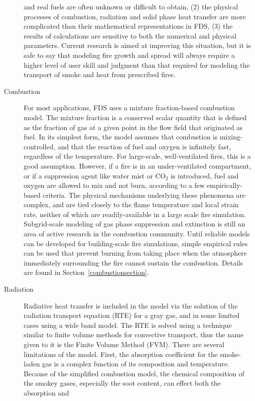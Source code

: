 \documentclass[11pt]{book}
\begin{document}
\begin{description}
and real fuels are often unknown or difficult to obtain, (2) the physical processes of combustion,
radiation and solid phase heat transfer are more complicated than their mathematical representations
in FDS, (3) the results of calculations are sensitive to both the numerical and physical parameters.
Current research is aimed at improving this situation, but it is safe to say that
modeling fire growth and spread will always require a higher level of
user skill and judgment than that required for modeling the transport of smoke and heat from prescribed fires.
\item[Combustion]
For most applications, FDS uses a mixture fraction-based combustion model.
The mixture fraction is a conserved scalar quantity that is defined as the
fraction of gas at a given point in the flow field that originated as fuel.
In its simplest form, the model assumes that combustion is mixing-controlled, and that the
reaction of fuel and oxygen is infinitely fast, regardless of the temperature.
For large-scale, well-ventilated
fires, this is a good assumption. However, if a fire is in an
under-ventilated compartment, or if a suppression agent like water
mist or CO$_2$ is introduced, fuel and oxygen are allowed to mix and not burn, according to a few empirically-based criteria.
The physical mechanisms underlying these phenomena are complex, and are tied closely to the flame temperature and local strain rate, neither of
which are readily-available in a large scale fire simulation.
Subgrid-scale modeling of gas phase suppression and
extinction is still an area of active research in the combustion
community. Until reliable models can be developed for building-scale
fire simulations, simple empirical rules can be used that
prevent burning from taking place when the atmosphere immediately
surrounding the fire cannot sustain the combustion. Details are found in
Section~\ref{combustionsection}.
\item[Radiation] Radiative heat transfer is included in the model via
the solution of the radiation transport equation (RTE) for a gray gas, and
in some limited cases using a wide band model.  The RTE is solved
using a technique similar to finite volume methods for convective
transport, thus the name given to it is the Finite Volume Method
(FVM). There are several limitations of the model. First, the
absorption coefficient for the smoke-laden gas is a complex function
of its composition and temperature. Because of the simplified
combustion model, the chemical composition of the smokey gases,
especially the soot content, can effect both the absorption and

\end{description}
\end{document}
